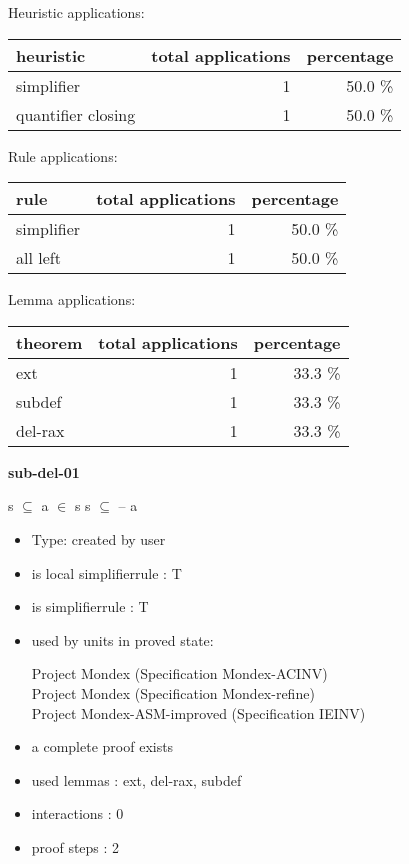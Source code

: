 \documentclass[a4paper]{article}
\begin{document}
\medskip


Heuristic applications:

\begin{supertabular}{l|r|r}
heuristic	& total applications & percentage \\ \hline
simplifier & 1 & 50.0 \% \\
quantifier closing & 1 & 50.0 \% \\

\end{supertabular}

Rule applications:

\begin{supertabular}{l|r|r}
rule	        & total applications & percentage \\ \hline
simplifier & 1 & 50.0 \% \\
all left & 1 & 50.0 \% \\

\end{supertabular}

Lemma applications:

\begin{supertabular}{l|r|r}
theorem	        & total applications & percentage \\ \hline
ext & 1 & 33.3 \% \\
subdef & 1 & 33.3 \% \\
del-rax & 1 & 33.3 \% \\

\end{supertabular}
\pagebreak

{\LARGE\bf sub-del-01}\label{lemma-sub-del-01}

\medskip

 \Fol s $\subseteq$  \And \Not a $\in$ s \Imp s $\subseteq$  -- a

\begin{itemize}

\item Type: created by user

\item is local simplifierrule : T
\item is simplifierrule : T
\item used by units in proved state:

Project Mondex (Specification Mondex-ACINV) \\
Project Mondex (Specification Mondex-refine) \\
Project Mondex-ASM-improved (Specification IEINV)
\item       a complete proof exists
\item       used lemmas  : ext, del-rax, subdef
\item       interactions : 0
\item       proof steps  : 2
\end{itemize}
\end{document}
